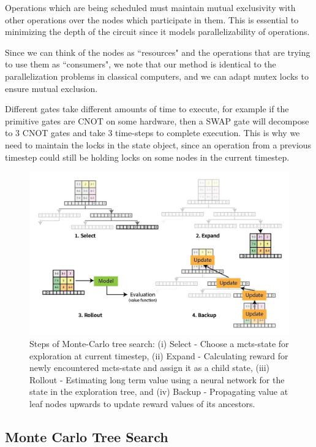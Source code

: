 \documentclass[%
 reprint,
 amsmath,amssymb,
 aps,
]{revtex4-2}
\begin{document}
Operations which are being scheduled must maintain mutual exclusivity with other operations over the nodes which participate in them. This is essential to minimizing the depth of the circuit since it models parallelizability of operations.

Since we can think of the nodes as ``resources" and the operations that are trying to use them as ``consumers", we note that our method is identical to the parallelization problems in classical computers, and we can adapt mutex locks \citet{mutex_dijkstra} to ensure mutual exclusion.

Different gates take different amounts of time to execute, for example if the primitive gates are CNOT on some hardware, then a SWAP gate will decompose to 3 CNOT gates and take 3 time-steps to complete execution. This is why we need to maintain the locks in the state object, since an operation from a previous timestep could still be holding locks on some nodes in the current timestep.

\begin{figure}[t]
    \includegraphics[width=\linewidth]{images/mcts-steps.jpg}
    \caption{\label{fig:mcts-explainer}
        Steps of Monte-Carlo tree search: (i) Select - Choose a mcts-state for exploration at current timestep, (ii) Expand - Calculating reward for newly encountered mcts-state and assign it as a child state, (iii) Rollout - Estimating long term value using a neural network for the state in the exploration tree, and (iv) Backup - Propagating value at leaf nodes upwards to update reward values of its ancestors.}
\end{figure}

\subsection{\label{sec:method-mcts}Monte Carlo Tree Search}
\end{document}
